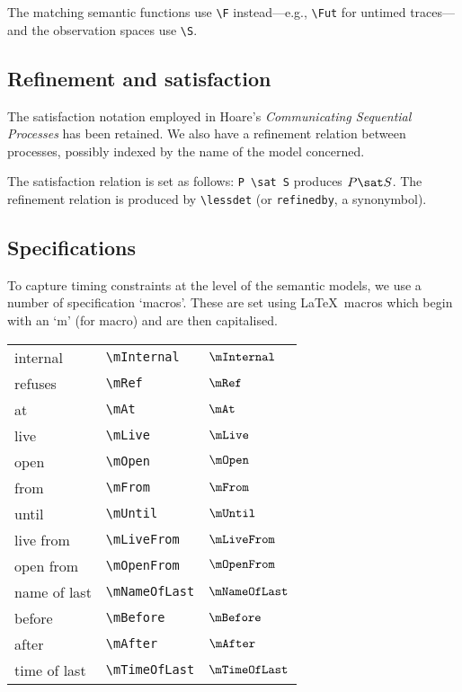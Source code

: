 \documentclass[12pt]{article}
\begin{document}
The matching semantic functions use \verb|\F| instead---e.g.,
\verb|\Fut| for untimed traces---and the observation spaces use
\verb|\S|.  

\subsection{Refinement and satisfaction}

The satisfaction notation employed in Hoare's {\sl Communicating
Sequential Processes} has been retained.  We also have a refinement
relation between processes, possibly indexed by the name of the model
concerned.

The satisfaction relation is set as follows: \verb|P \sat S| produces
$P \sat S$.  The refinement relation is produced by \verb|\lessdet| (or
\verb|refinedby|, a synonymbol).  

\subsection{Specifications}

To capture timing constraints at the level of the semantic models, we
use a number of specification `macros'.  These are set using \LaTeX\
macros which begin with an `m' (for macro) and are then capitalised.
\par 
\begin{tabular}{p{1.95in}p{1.75in}l} \\
internal        & \verb|\mInternal  | & $ \mInternal $    \\[0.4ex]
refuses         & \verb|\mRef       | & $ \mRef      $    \\[0.4ex]
at              & \verb|\mAt        | & $ \mAt       $    \\[0.4ex]
live            & \verb|\mLive      | & $ \mLive     $    \\[0.4ex]
open            & \verb|\mOpen      | & $ \mOpen     $    \\[0.4ex]
from            & \verb|\mFrom      | & $ \mFrom     $    \\[0.4ex]
until           & \verb|\mUntil     | & $ \mUntil    $    \\[0.4ex]
live from       & \verb|\mLiveFrom  | & $ \mLiveFrom  $   \\[0.4ex]
open from       & \verb|\mOpenFrom  | & $ \mOpenFrom  $   \\[0.4ex]
name of last    & \verb|\mNameOfLast| & $ \mNameOfLast $  \\[0.4ex]
before          & \verb|\mBefore    | & $ \mBefore   $    \\[0.4ex]
after           & \verb|\mAfter     | & $ \mAfter   $     \\[0.4ex]
time of last    & \verb|\mTimeOfLast| & $ \mTimeOfLast $  \\[0.4ex]
\end{tabular}
\end{document}
